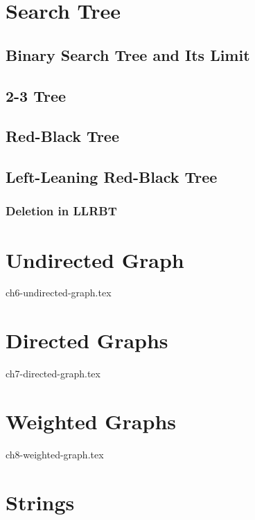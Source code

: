 \documentclass{report}
\begin{document}

\chapter{Search Tree}

\section{Binary Search Tree and Its Limit}

\section{2-3 Tree}

\section{Red-Black Tree}

\section{Left-Leaning Red-Black Tree}

\subsection{Deletion in LLRBT}


\chapter{Undirected Graph}

{ch6-undirected-graph.tex}


\chapter{Directed Graphs}

{ch7-directed-graph.tex}


\chapter{Weighted Graphs}

{ch8-weighted-graph.tex}


\chapter{Strings}
\end{document}
